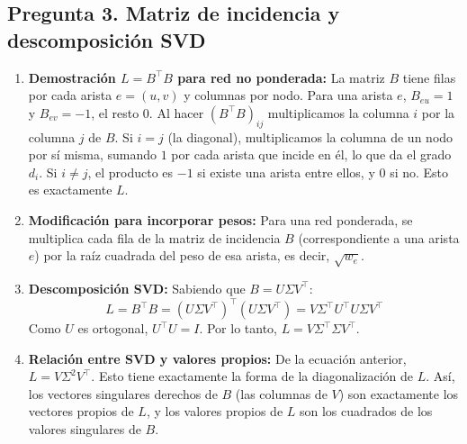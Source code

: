 \documentclass{article}
\begin{document}
	\subsection*{Pregunta 3. Matriz de incidencia y descomposición SVD}
	\begin{enumerate}[label=\alph*)]
		\item \textbf{Demostración \(L = B^\top B\) para red no ponderada:} La matriz \(B\) tiene filas por cada arista \(e = (u, v)\) y columnas por nodo. Para una arista \(e\), \(B_{eu} = 1\) y \(B_{ev} = -1\), el resto $0$. Al hacer \((B^\top B)_{ij}\) multiplicamos la columna \(i\) por la columna \(j\) de \(B\). Si \(i = j\) (la diagonal), multiplicamos la columna de un nodo por sí misma, sumando $1$ por cada arista que incide en él, lo que da el grado \(d_i\). Si \(i \ne j\), el producto es \(-1\) si existe una arista entre ellos, y $0$ si no. Esto es exactamente \(L\).
		
		\item \textbf{Modificación para incorporar pesos:} Para una red ponderada, se multiplica cada fila de la matriz de incidencia \(B\) (correspondiente a una arista \(e\)) por la raíz cuadrada del peso de esa arista, es decir, \(\sqrt{w_e}\).
		
		\item \textbf{Descomposición SVD:} Sabiendo que \(B = U \Sigma V^\top\):
		\[
		L = B^\top B = (U \Sigma V^\top)^\top (U \Sigma V^\top) = V \Sigma^\top U^\top U \Sigma V^\top
		\]
		Como \(U\) es ortogonal, \(U^\top U = I\). Por lo tanto, \(L = V \Sigma^\top \Sigma V^\top\).
		
		\item \textbf{Relación entre SVD y valores propios:} De la ecuación anterior, \(L = V \Sigma^2 V^\top\). Esto tiene exactamente la forma de la diagonalización de \(L\). Así, los vectores singulares derechos de \(B\) (las columnas de \(V\)) son exactamente los vectores propios de \(L\), y los valores propios de \(L\) son los cuadrados de los valores singulares de \(B\).
	\end{enumerate}
	
\end{document}
